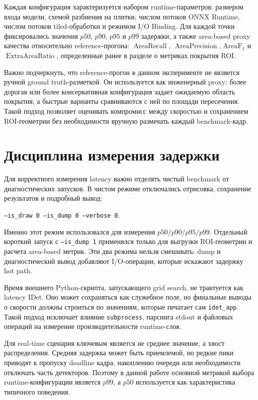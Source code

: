 \documentclass[12pt,a4paper,oneside,openany]{report}
\begin{document}
Каждая конфигурация характеризуется набором runtime-параметров: размером входа модели, схемой разбиения на плитки, числом потоков ONNX Runtime, числом потоков tiled-обработки и режимом I/O Binding. Для каждой точки фиксировались значения $p50$, $p90$, $p95$ и $p99$ задержки, а также area-based proxy качества относительно reference-прогона: $\operatorname{AreaRecall}$, $\operatorname{AreaPrecision}$, $\operatorname{AreaF_1}$ и $\operatorname{ExtraAreaRatio}$, определенные ранее в разделе о метриках покрытия ROI.

Важно подчеркнуть, что reference-прогон в данном эксперименте не является ручной ground truth-разметкой. Он используется как инженерный proxy: более дорогая или более консервативная конфигурация задает ожидаемую область покрытия, а быстрые варианты сравниваются с ней по площади пересечения. Такой подход позволяет оценивать компромисс между скоростью и сохранением ROI-геометрии без необходимости вручную размечать каждый benchmark-кадр.


\section{Дисциплина измерения задержки}

Для корректного измерения latency важно отделять чистый benchmark от диагностических запусков. В чистом режиме отключались отрисовка, сохранение результатов и подробный вывод:\begin{center}\texttt{--is\_draw 0 --is\_dump 0 --verbose 0}.\end{center}Именно этот режим использовался для измерения $p50/p90/p95/p99$. Отдельный короткий запуск с \texttt{--is\_dump 1} применялся только для выгрузки ROI-геометрии и расчета area-based метрик. Эти два режима нельзя смешивать: dump и диагностический вывод добавляют I/O-операции, которые искажают задержку hot path.

Время внешнего Python-скрипта, запускающего grid search, не трактуется как latency IDet. Оно может сохраняться как служебное поле, но финальные выводы о скорости должны строиться по значениям, которые печатает сам \texttt{idet\_app}. Такой подход исключает влияние \texttt{subprocess}, парсинга stdout и файловых операций на измерение производительности runtime-слоя.

Для real-time сценария ключевым является не среднее значение, а хвост распределения. Средняя задержка может быть приемлемой, но редкие пики приводят к пропуску deadline кадра, накоплению очереди или необходимости отключать часть детекторов. Поэтому в данной работе основной метрикой выбора runtime-конфигурации является $p99$, а $p50$ используется как характеристика типичного поведения.
\end{document}

